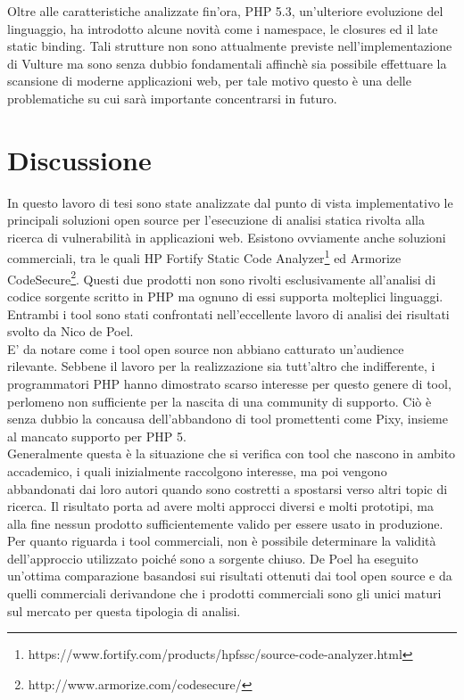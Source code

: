 Oltre alle caratteristiche analizzate fin'ora, PHP 5.3, un'ulteriore evoluzione del linguaggio, ha introdotto alcune novità come i namespace, le closures ed il late static binding. Tali strutture non sono attualmente previste nell'implementazione di Vulture ma sono senza dubbio fondamentali affinchè sia possibile effettuare la scansione di moderne applicazioni web, per tale motivo questo è una delle problematiche su cui sarà importante concentrarsi in futuro.

\chapter{Discussione}
In questo lavoro di tesi sono state analizzate dal punto di vista implementativo le principali soluzioni open source per l'esecuzione di analisi statica rivolta alla ricerca di vulnerabilità in applicazioni web. Esistono ovviamente anche soluzioni commerciali, tra le quali HP Fortify Static Code Analyzer\footnote{https://www.fortify.com/products/hpfssc/source-code-analyzer.html} ed Armorize CodeSecure\footnote{http://www.armorize.com/codesecure/}. Questi due prodotti non sono rivolti esclusivamente all'analisi di codice sorgente scritto in PHP ma ognuno di essi supporta molteplici linguaggi. Entrambi i tool sono stati confrontati nell'eccellente lavoro di analisi dei risultati svolto da Nico de Poel\cite{CITAZIONE}.\\
E' da notare come i tool open source non abbiano catturato un'audience rilevante. Sebbene il lavoro per la realizzazione sia tutt'altro che indifferente, i programmatori PHP hanno dimostrato scarso interesse per questo genere di tool, perlomeno non sufficiente per la nascita di una community di supporto. Ciò è senza dubbio la concausa dell'abbandono di tool promettenti come Pixy, insieme al mancato supporto per PHP 5.\\
Generalmente questa è la situazione che si verifica con tool che nascono in ambito accademico, i quali inizialmente raccolgono interesse, ma poi vengono abbandonati dai loro autori quando sono costretti a spostarsi verso altri topic di ricerca. Il risultato porta ad avere molti approcci diversi e molti prototipi, ma alla fine nessun prodotto sufficientemente valido per essere usato in produzione.\\
Per quanto riguarda i tool commerciali, non è possibile determinare la validità dell'approccio utilizzato poiché sono a sorgente chiuso. De Poel ha eseguito un'ottima comparazione basandosi sui risultati ottenuti dai tool open source e da quelli commerciali derivandone che i prodotti commerciali sono gli unici maturi sul mercato per questa tipologia di analisi.\\
